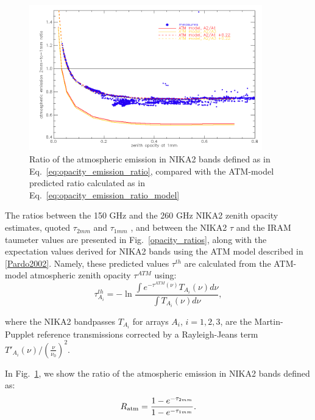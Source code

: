 \begin{figure}[ht]
\begin{center}
\includegraphics[width=0.9\textwidth]{Figures/opacity_tau1_tau2_emissionratio_N2R9_N2R10.png}
\caption{Ratio of the atmospheric emission in NIKA2 bands defined as
  in Eq.~\ref{eq:opacity_emission_ratio}, compared with the ATM-model
  predicted ratio calculated as in Eq.~\ref{eq:opacity_emission_ratio_model}}
  \label{fig:opacity_emission}
\end{center}
\end{figure}

The ratios between the 150 GHz and the 260 GHz NIKA2 zenith opacity
estimates, quoted $\tau_{2mm}$ and $\tau_{1mm}$ , and
between the NIKA2 $\tau$ and the IRAM taumeter values are presented in
Fig.~\ref{opacity_ratios}, along with the expectation values derived for NIKA2 bands
using the ATM model described in \ref{Pardo2002}. Namely, these
predicted values $\tau^{th}$ are calculated from the ATM-model
atmospheric zenith opacity $\tau^{ATM}$ using:  
\begin{equation}
  \tau^{th}_{A_i} = - \ln{\frac{\int e^{-\tau^{ATM}(\nu)}
      T_{A_i}(\nu) d\nu}{ \int T_{A_i}(\nu) d\nu}},
\end{equation}

where the NIKA2 bandpasses $T_{A_i}$ for arrays $A_i$, $i=1, 2, 3$, are the Martin-Pupplet reference transmissions
corrected by a Rayleigh-Jeans term  $T'_{A_i}(\nu) /
\left( \frac{\nu}{\nu_0}\right)^2$. 

In Fig.~\ref{fig:opacity_emission}, we
show the ratio of the atmospheric emission in NIKA2 bands defined as:
\begin{equation}
  R_{\rm{atm}} = \frac{1-e^{-\tau_{2mm}}}{1-e^{-\tau_{1mm}}}.
    \label{eq:opacity_emission_ratio}
\end{equation}

